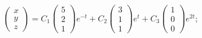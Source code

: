 \begin{enumsolsfull}
		\item \( \begin{pmatrix} x \\ y \\ z \end{pmatrix} = C_1 \begin{pmatrix} 5 \\ 2 \\ 1 \end{pmatrix} e^{-t} + C_2 \begin{pmatrix} 3 \\ 1 \\ 1 \end{pmatrix} e^{t} + C_3 \begin{pmatrix} 1 \\ 0 \\ 0 \end{pmatrix} e^{2t} \); %

\end{enumsolsfull}
